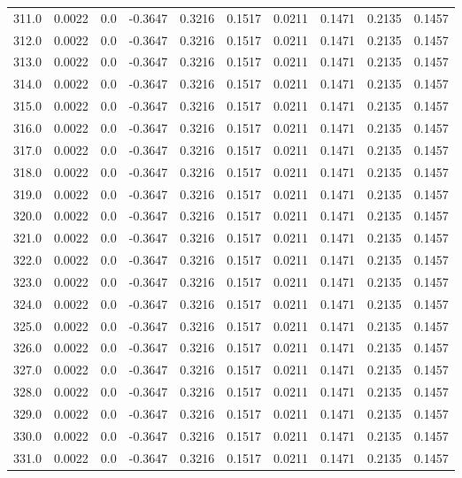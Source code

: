 \begin{longtable}{lrrrrrrrrr}
311.0 & 0.0022 & 0.0 & -0.3647 & 0.3216 & 0.1517 & 0.0211 & 0.1471 & 0.2135 & 0.1457 \\
312.0 & 0.0022 & 0.0 & -0.3647 & 0.3216 & 0.1517 & 0.0211 & 0.1471 & 0.2135 & 0.1457 \\
313.0 & 0.0022 & 0.0 & -0.3647 & 0.3216 & 0.1517 & 0.0211 & 0.1471 & 0.2135 & 0.1457 \\
314.0 & 0.0022 & 0.0 & -0.3647 & 0.3216 & 0.1517 & 0.0211 & 0.1471 & 0.2135 & 0.1457 \\
315.0 & 0.0022 & 0.0 & -0.3647 & 0.3216 & 0.1517 & 0.0211 & 0.1471 & 0.2135 & 0.1457 \\
316.0 & 0.0022 & 0.0 & -0.3647 & 0.3216 & 0.1517 & 0.0211 & 0.1471 & 0.2135 & 0.1457 \\
317.0 & 0.0022 & 0.0 & -0.3647 & 0.3216 & 0.1517 & 0.0211 & 0.1471 & 0.2135 & 0.1457 \\
318.0 & 0.0022 & 0.0 & -0.3647 & 0.3216 & 0.1517 & 0.0211 & 0.1471 & 0.2135 & 0.1457 \\
319.0 & 0.0022 & 0.0 & -0.3647 & 0.3216 & 0.1517 & 0.0211 & 0.1471 & 0.2135 & 0.1457 \\
320.0 & 0.0022 & 0.0 & -0.3647 & 0.3216 & 0.1517 & 0.0211 & 0.1471 & 0.2135 & 0.1457 \\
321.0 & 0.0022 & 0.0 & -0.3647 & 0.3216 & 0.1517 & 0.0211 & 0.1471 & 0.2135 & 0.1457 \\
322.0 & 0.0022 & 0.0 & -0.3647 & 0.3216 & 0.1517 & 0.0211 & 0.1471 & 0.2135 & 0.1457 \\
323.0 & 0.0022 & 0.0 & -0.3647 & 0.3216 & 0.1517 & 0.0211 & 0.1471 & 0.2135 & 0.1457 \\
324.0 & 0.0022 & 0.0 & -0.3647 & 0.3216 & 0.1517 & 0.0211 & 0.1471 & 0.2135 & 0.1457 \\
325.0 & 0.0022 & 0.0 & -0.3647 & 0.3216 & 0.1517 & 0.0211 & 0.1471 & 0.2135 & 0.1457 \\
326.0 & 0.0022 & 0.0 & -0.3647 & 0.3216 & 0.1517 & 0.0211 & 0.1471 & 0.2135 & 0.1457 \\
327.0 & 0.0022 & 0.0 & -0.3647 & 0.3216 & 0.1517 & 0.0211 & 0.1471 & 0.2135 & 0.1457 \\
328.0 & 0.0022 & 0.0 & -0.3647 & 0.3216 & 0.1517 & 0.0211 & 0.1471 & 0.2135 & 0.1457 \\
329.0 & 0.0022 & 0.0 & -0.3647 & 0.3216 & 0.1517 & 0.0211 & 0.1471 & 0.2135 & 0.1457 \\
330.0 & 0.0022 & 0.0 & -0.3647 & 0.3216 & 0.1517 & 0.0211 & 0.1471 & 0.2135 & 0.1457 \\
331.0 & 0.0022 & 0.0 & -0.3647 & 0.3216 & 0.1517 & 0.0211 & 0.1471 & 0.2135 & 0.1457 \\

\end{longtable}
